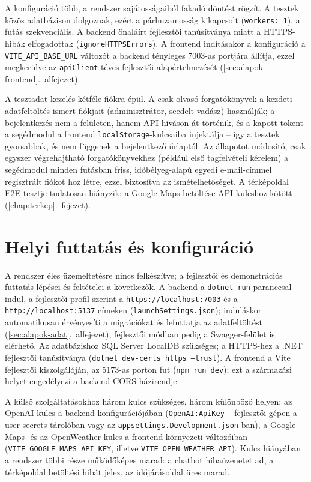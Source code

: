 A konfiguráció több, a rendszer sajátosságaiból fakadó döntést rögzít. A tesztek közös
adatbázison dolgoznak, ezért a párhuzamosság kikapcsolt (\texttt{workers:~1}), a futás
szekvenciális. A backend önaláírt fejlesztői tanúsítványa miatt a HTTPS-hibák elfogadottak
(\texttt{ignoreHTTPSErrors}). A frontend indításakor a konfiguráció a
\texttt{VITE\_API\_BASE\_URL} változót a backend tényleges 7003-as portjára állítja, ezzel
megkerülve az \texttt{apiClient} téves fejlesztői alapértelmezését
(\ref{sec:alapok-frontend}.~alfejezet).

A tesztadat-kezelés kétféle fiókra épül. A csak olvasó forgatókönyvek a kezdeti adatfeltöltés
ismert fiókjait (adminisztrátor, seedelt vadász) használják; a bejelentkezés nem a felületen,
hanem API-híváson át történik, és a kapott tokent a segédmodul a frontend
\texttt{localStorage}-kulcsaiba injektálja -- így a tesztek gyorsabbak, és nem függenek a
bejelentkező űrlaptól. Az állapotot módosító, csak egyszer végrehajtható forgatókönyvekhez
(például első tagfelvételi kérelem) a segédmodul minden futásban friss, időbélyeg-alapú egyedi
e-mail-címmel regisztrált fiókot hoz létre, ezzel biztosítva az ismételhetőséget. A térképoldal
E2E-tesztje tudatosan hiányzik: a Google Maps betöltése API-kulcshoz kötött
(\ref{chap:terkep}.~fejezet).

\section{Helyi futtatás és konfiguráció}
\label{sec:teszt-uzemeltetes}

A rendszer éles üzemeltetésre nincs felkészítve; a fejlesztői és demonstrációs futtatás
lépései és feltételei a következők. A backend a \texttt{dotnet run} paranccsal indul, a
fejlesztői profil szerint a \texttt{https://localhost:7003} és a \texttt{http://localhost:5137}
címeken (\texttt{launchSettings.json}); induláskor automatikusan érvényesíti a migrációkat és
lefuttatja az adatfeltöltést (\ref{sec:alapok-adat}.~alfejezet), fejlesztői módban pedig a
Swagger-felület is elérhető. Az adatbázishoz SQL Server LocalDB szükséges; a HTTPS-hez a .NET
fejlesztői tanúsítványa (\texttt{dotnet dev-certs https --trust}). A frontend a Vite fejlesztői
kiszolgálóján, az 5173-as porton fut (\texttt{npm run dev}); ezt a származási helyet engedélyezi
a backend CORS-házirendje.

A külső szolgáltatásokhoz három kulcs szükséges, három különböző helyen: az OpenAI-kulcs a
backend konfigurációjában (\texttt{OpenAI:ApiKey} -- fejlesztői gépen a user secrets tárolóban
vagy az \texttt{appsettings.Development.json}-ban), a Google Maps- és az OpenWeather-kulcs a
frontend környezeti változóiban (\texttt{VITE\_GOOGLE\_MAPS\_API\_KEY}, illetve
\texttt{VITE\_OPEN\_WEATHER\_API}). Kulcs hiányában a rendszer többi része működőképes marad:
a chatbot hibaüzenetet ad, a térképoldal betöltési hibát jelez, az időjárásoldal üres marad.

